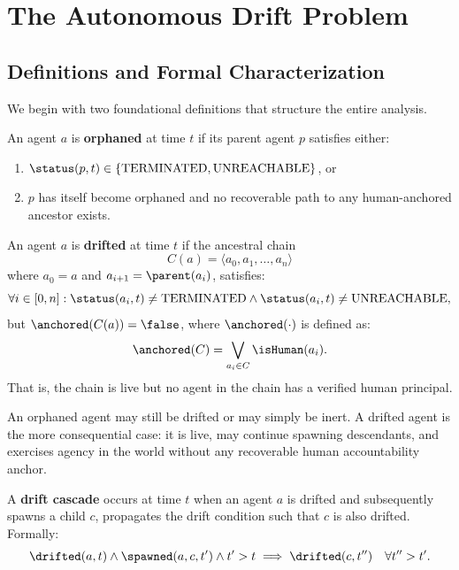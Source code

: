 \section{The Autonomous Drift Problem}

\subsection{Definitions and Formal Characterization}

We begin with two foundational definitions that structure the entire analysis.

\begin{definition}
An agent $a$ is \textbf{orphaned} at time $t$ if its parent agent $p$ satisfies either:
\begin{enumerate}
    \item $\status(p, t) \in \{\text{TERMINATED}, \text{UNREACHABLE}\}$, or
    \item $p$ has itself become orphaned and no recoverable path to any human-anchored ancestor exists.
\end{enumerate}
\end{definition}

\begin{definition}
An agent $a$ is \textbf{drifted} at time $t$ if the ancestral chain
\[
C(a) = \langle a_0, a_1, \ldots, a_n \rangle
\]
where $a_0 = a$ and $a_{i+1} = \parent(a_i)$, satisfies:
\[
\forall i \in [0, n]: \status(a_i, t) \neq \text{TERMINATED} \land \status(a_i, t) \neq \text{UNREACHABLE},
\]
but $\anchored(C(a)) = \false$, where $\anchored(\cdot)$ is defined as:
\[
\anchored(C) = \bigvee_{a_i \in C} \isHuman(a_i).
\]
That is, the chain is live but no agent in the chain has a verified human principal.
\end{definition}

An orphaned agent may still be drifted or may simply be inert. A drifted agent is the more consequential case: it is live, may continue spawning descendants, and exercises agency in the world without any recoverable human accountability anchor.

\begin{definition}
A \textbf{drift cascade} occurs at time $t$ when an agent $a$ is drifted and subsequently spawns a child $c$, propagates the drift condition such that $c$ is also drifted. Formally:
\[
\drifted(a, t) \land \spawned(a, c, t') \land t' > t \implies \drifted(c, t'')\quad \forall t'' > t'.
\]
\end{definition}

